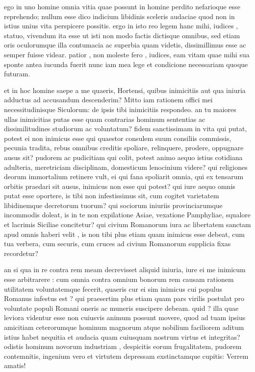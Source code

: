  ego in uno homine omnia vitia quae possunt in homine perdito nefarioque esse reprehendo; nullum esse dico indicium libidinis sceleris audaciae quod non in istius unius vita perspicere possitis. ergo in isto reo legem hanc mihi, iudices , statuo, vivendum ita esse ut isti non modo factis dictisque omnibus, sed etiam oris oculorumque illa contumacia ac superbia quam videtis, dissimillimus esse ac semper fuisse videar. patior , non moleste fero , iudices, eam vitam quae mihi sua sponte antea iucunda fuerit nunc iam mea lege et condicione necessariam quoque futuram.

 et in hoc homine saepe a me quaeris, Hortensi, quibus inimicitiis aut qua iniuria adductus ad accusandum descenderim? Mitto iam rationem offici mei necessitudinisque Siculorum: de ipsis tibi inimicitiis respondeo. an tu maiores ullas inimicitias putas esse quam contrarias hominum sententias ac dissimilitudines studiorum ac voluntatum? fidem sanctissimam in vita qui putat, potest ei non inimicus esse qui quaestor consulem suum consiliis commissis, pecunia tradita, rebus omnibus creditis spoliare, relinquere, prodere, oppugnare ausus sit? pudorem ac pudicitiam qui colit, potest animo aequo istius cotidiana adulteria, meretriciam disciplinam, domesticum lenocinium videre? qui religiones deorum immortalium retinere vult, ei qui fana spoliarit omnia, qui ex tensarum orbitis praedari sit ausus, inimicus non esse qui potest? qui iure aequo omnis putat esse oportere, is tibi non infestissimus sit, cum cogitet varietatem libidinemque decretorum tuorum? qui sociorum iniuriis provinciarumque incommodis doleat, is in te non expilatione Asiae, vexatione Pamphyliae, squalore et lacrimis Siciliae concitetur? qui civium Romanorum iura ac libertatem sanctam apud omnis haberi velit , is non tibi plus etiam quam inimicus esse debeat, cum tua verbera, cum securis, cum cruces ad civium Romanorum supplicia fixas recordetur?

 an si qua in re contra rem meam decrevisset aliquid iniuria, iure ei me inimicum esse arbitrarere : cum omnia contra omnium bonorum rem causam rationem utilitatem voluntatemque fecerit, quaeris cur ei sim inimicus cui populus Romanus infestus est ? qui praesertim plus etiam quam pars virilis postulat pro voluntate populi Romani oneris ac muneris suscipere debeam. quid ? illa quae leviora videntur esse non cuiusvis animum possunt movere, quod ad tuam ipsius amicitiam ceterorumque hominum magnorum atque nobilium faciliorem aditum istius habet nequitia et audacia quam cuiusquam nostrum virtus et integritas? odistis hominum novorum industriam , despicitis eorum frugalitatem, pudorem contemnitis, ingenium vero et virtutem depressam exstinctamque cupitis: Verrem amatis!

